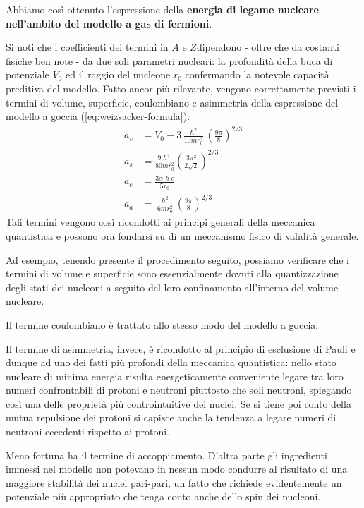 Abbiamo così ottenuto l’espressione della \textbf{energia di legame nucleare nell’ambito del modello a gas di fermioni}.

Si noti che i coefficienti dei termini in $A$ e $Z $dipendono - oltre che da costanti fisiche ben note - da due soli parametri nucleari:
la profondità della buca di potenziale $V_{0}$ ed il raggio del nucleone $r_{0}$ confermando la notevole capacità preditiva del modello. 
Fatto ancor più rilevante, vengono correttamente previsti i termini di volume, superficie, coulombiano e asimmetria della 
espressione del modello a goccia (\ref{eq:weizsacker-formula}):
\begin{align*}
	a_{v} &= V_{0} - 3 \frac{\hslash^{2}}{10 m r_{0}^{2}} \left( \frac{9\pi}{8} \right)^{2/3} \\
	a_{s} &= \frac{9\hslash^{2}}{80 m r_{0}^{2}} \left(  \frac{3\pi^{2}}{2\sqrt{ 2 }} \right)^{2/3} \\
	a_{c} &= \frac{3 \alpha \hslash c}{5 r_{0}} \\
	a_{a} &= \frac{\hslash^{2}}{6 m r_{0}^{2}} \left(\frac{9\pi}{8} \right)^{2/3}
\end{align*}
Tali termini vengono così ricondotti ai principi generali della meccanica quantistica e possono ora fondarsi su di un meccanismo fisico di validità generale.

Ad esempio, tenendo presente il procedimento seguito, possiamo verificare che i termini di volume e superficie sono essenzialmente dovuti alla quantizzazione degli stati dei nucleoni a seguito del loro confinamento all’interno del volume nucleare.

Il termine coulombiano è trattato allo stesso modo del modello a goccia.

Il termine di asimmetria, invece, è ricondotto al principio di esclusione di Pauli e dunque ad uno dei fatti più profondi della meccanica quantistica: nello stato nucleare di minima energia risulta energeticamente conveniente
legare tra loro numeri confrontabili di protoni e neutroni piuttosto che soli neutroni, spiegando così una delle proprietà più controintuitive dei nuclei.
Se si tiene poi conto della mutua repulsione dei protoni si capisce anche la tendenza a legare numeri di neutroni eccedenti rispetto ai protoni.

Meno fortuna ha il termine di accoppiamento.
D’altra parte gli ingredienti immessi nel modello non potevano in nessun modo condurre al risultato di una maggiore stabilità dei nuclei pari-pari, un fatto che richiede evidentemente un potenziale più appropriato che tenga conto anche dello spin dei nucleoni.

